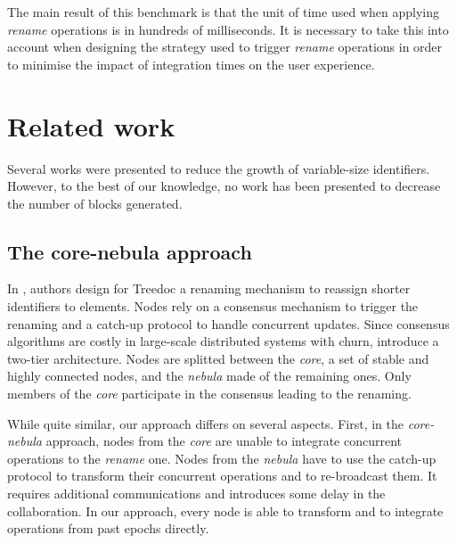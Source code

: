\documentclass[sigplan,10pt]{acmart}
\begin{document}
The main result of this benchmark is that the unit of time used when applying \emph{rename} operations is in hundreds of milliseconds.
It is necessary to take this into account when designing the strategy used to trigger \emph{rename} operations in order to minimise the impact of integration times on the user experience.


\section{Related work}

\label{sec:related-work}

Several works were presented to reduce the growth of variable-size identifiers.
However, to the best of our knowledge, no work has been presented to decrease the number of blocks generated.

\subsection{The core-nebula approach}

In \cite{letia:hal-01248270,zawirski:hal-01248197}, authors design for Treedoc \cite{5158449} a renaming mechanism to reassign shorter identifiers to elements.
Nodes rely on a consensus mechanism to trigger the renaming and a catch-up protocol to handle concurrent updates.
Since consensus algorithms are costly in large-scale distributed systems with churn, \citet{letia:hal-01248270} introduce a two-tier architecture.
Nodes are splitted between the \emph{core}, a set of stable and highly connected nodes, and the \emph{nebula} made of the remaining ones.
Only members of the \emph{core} participate in the consensus leading to the renaming.

While quite similar, our approach differs on several aspects.
First, in the \emph{core-nebula} approach, nodes from the \emph{core} are unable to integrate concurrent operations to the \emph{rename} one.
Nodes from the \emph{nebula} have to use the catch-up protocol to transform their concurrent operations and to re-broadcast them.
It requires additional communications and introduces some delay in the collaboration.
In our approach, every node is able to transform and to integrate operations from past epochs directly.
\end{document}
